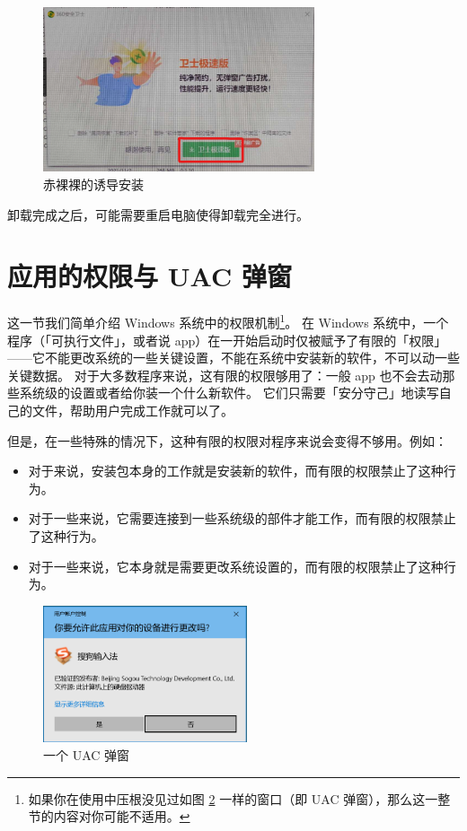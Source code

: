 \begin{figure}[htb!]
  \centering
  \includegraphics[width=8cm]{assets/Confusing_Uninstall.png}
  \caption{赤裸裸的诱导安装}
  \label{Confusing_Uninstall}
\end{figure}

卸载完成之后，可能需要重启电脑使得卸载完全进行。

\section{应用的权限与 UAC 弹窗}

这一节我们简单介绍 Windows 系统中的权限机制\footnote{如果你在使用中压根没见过如图 \ref{UAC} 一样的窗口（即 UAC 弹窗），那么这一整节的内容对你可能不适用。}。
在 Windows 系统中，一个程序（「可执行文件」，或者说 app）在一开始启动时仅被赋予了有限的「权限」——它不能更改系统的一些关键设置，不能在系统中安装新的软件，不可以动一些关键数据。
对于大多数程序来说，这有限的权限够用了：一般 app 也不会去动那些系统级的设置或者给你装一个什么新软件。
它们只需要「安分守己」地读写自己的文件，帮助用户完成工作就可以了。

但是，在一些特殊的情况下，这种有限的权限对程序来说会变得不够用。例如：

\begin{itemize}
  \item 对于来说，安装包本身的工作就是安装新的软件，而有限的权限禁止了这种行为。
  \item 对于一些来说，它需要连接到一些系统级的部件才能工作，而有限的权限禁止了这种行为。
  \item 对于一些来说，它本身就是需要更改系统设置的，而有限的权限禁止了这种行为。
\end{itemize}

\begin{figure}
  \centering
  \includegraphics[width=6cm]{assets/UAC.png}
  \caption{一个 UAC 弹窗}
  \label{UAC}
\end{figure}

